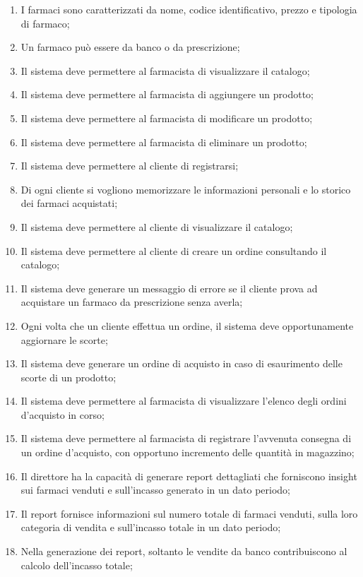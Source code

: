 \begin{enumerate}
	\item I farmaci sono caratterizzati da nome, codice identificativo, prezzo e tipologia di farmaco;
	\item Un farmaco può essere da banco o da prescrizione;
	\item Il sistema deve permettere al farmacista di visualizzare il catalogo;
	\item Il sistema deve permettere al farmacista di aggiungere un prodotto;
	\item Il sistema deve permettere al farmacista di modificare un prodotto;
	\item Il sistema deve permettere al farmacista di eliminare un prodotto;
	\item Il sistema deve permettere al cliente di registrarsi;
	\item Di ogni cliente si vogliono memorizzare le informazioni personali e lo storico dei farmaci acquistati;
	\item Il sistema deve permettere al cliente di visualizzare il catalogo;
	\item Il sistema deve permettere al cliente di creare un ordine consultando il catalogo;
	\item Il sistema deve generare un messaggio di errore se il cliente prova ad acquistare un farmaco da prescrizione senza averla;
	\item Ogni volta che un cliente effettua un ordine, il sistema deve opportunamente aggiornare le scorte;
	\item Il sistema deve generare un ordine di acquisto in caso di esaurimento delle scorte di un prodotto;
	\item Il sistema deve permettere al farmacista di visualizzare l'elenco degli ordini d'acquisto in corso;
	\item Il sistema deve permettere al farmacista di registrare l'avvenuta consegna di un ordine d'acquisto, con opportuno incremento delle quantità in magazzino;
	\item Il direttore ha la capacità di generare report dettagliati che forniscono insight sui farmaci venduti e sull'incasso generato in un dato periodo;
	\item Il report fornisce informazioni sul numero totale di farmaci venduti, sulla loro categoria di vendita e sull'incasso totale in un dato periodo;
	\item Nella generazione dei report, soltanto le vendite da banco contribuiscono al calcolo dell'incasso totale;
\end{enumerate}

